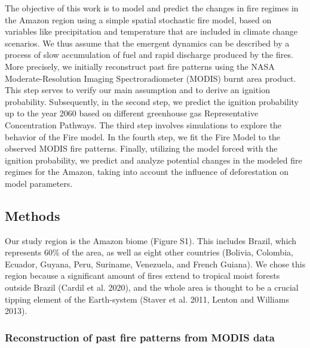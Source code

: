 \documentclass[
]{article}
\begin{document}
The objective of this work is to model and predict the changes in fire
regimes in the Amazon region using a simple spatial stochastic fire
model, based on variables like precipitation and temperature that are
included in climate change scenarios. We thus assume that the emergent
dynamics can be described by a process of slow accumulation of fuel and
rapid discharge produced by the fires. More precisely, we initially
reconstruct past fire patterns using the NASA Moderate-Resolution
Imaging Spectroradiometer (MODIS) burnt area product. This step serves
to verify our main assumption and to derive an ignition probability.
Subsequently, in the second step, we predict the ignition probability up
to the year 2060 based on different greenhouse gas Representative
Concentration Pathways. The third step involves simulations to explore
the behavior of the Fire model. In the fourth step, we fit the Fire
Model to the observed MODIS fire patterns. Finally, utilizing the model
forced with the ignition probability, we predict and analyze potential
changes in the modeled fire regimes for the Amazon, taking into account
the influence of deforestation on model parameters.

\subsection{Methods}\label{methods}

Our study region is the Amazon biome (Figure S1). This includes Brazil,
which represents 60\% of the area, as well as eight other countries
(Bolivia, Colombia, Ecuador, Guyana, Peru, Suriname, Venezuela, and
French Guiana). We chose this region because a significant amount of
fires extend to tropical moist forests outside Brazil (Cardil et al.
2020), and the whole area is thought to be a crucial tipping element of
the Earth-system (Staver et al. 2011, Lenton and Williams 2013).

\subsubsection{Reconstruction of past fire patterns from MODIS
data}\label{reconstruction-of-past-fire-patterns-from-modis-data}
\end{document}
